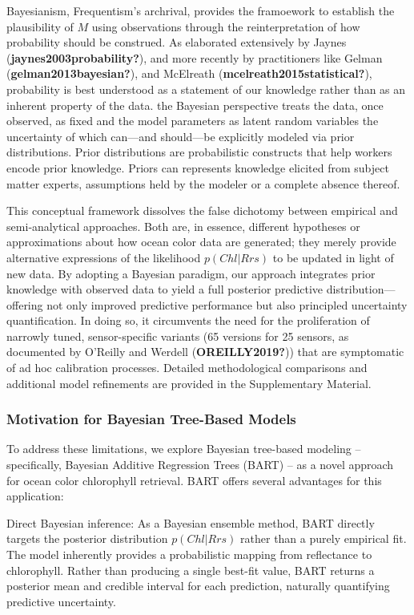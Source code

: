 \documentclass[
]{agujournal2019}
\begin{document}
Bayesianism, Frequentism's archrival, provides the framoework to
establish the plausibility of \(M\) using observations through the
reinterpretation of how probability should be construed. As elaborated
extensively by Jaynes (\textbf{jaynes2003probability?}), and more
recently by practitioners like Gelman (\textbf{gelman2013bayesian?}),
and McElreath (\textbf{mcelreath2015statistical?}), probability is best
understood as a statement of our knowledge rather than as an inherent
property of the data. the Bayesian perspective treats the data, once
observed, as fixed and the model parameters as latent random variables
the uncertainty of which can---and should---be explicitly modeled via
prior distributions. Prior distributions are probabilistic constructs
that help workers encode prior knowledge. Priors can represents
knowledge elicited from subject matter experts, assumptions held by the
modeler or a complete absence thereof.

This conceptual framework dissolves the false dichotomy between
empirical and semi‑analytical approaches. Both are, in essence,
different hypotheses or approximations about how ocean color data are
generated; they merely provide alternative expressions of the likelihood
\(p(Chl | Rrs)\) to be updated in light of new data. By adopting a
Bayesian paradigm, our approach integrates prior knowledge with observed
data to yield a full posterior predictive distribution---offering not
only improved predictive performance but also principled uncertainty
quantification. In doing so, it circumvents the need for the
proliferation of narrowly tuned, sensor-specific variants (65 versions
for 25 sensors, as documented by O'Reilly and Werdell
(\textbf{OREILLY2019?})) that are symptomatic of ad hoc calibration
processes. Detailed methodological comparisons and additional model
refinements are provided in the Supplementary Material.

\subsubsection{Motivation for Bayesian Tree-Based
Models}\label{motivation-for-bayesian-tree-based-models}

To address these limitations, we explore Bayesian tree-based modeling --
specifically, Bayesian Additive Regression Trees (BART) -- as a novel
approach for ocean color chlorophyll retrieval. BART offers several
advantages for this application:

Direct Bayesian inference: As a Bayesian ensemble method, BART directly
targets the posterior distribution \(p(Chl | Rrs)\) rather than a purely
empirical fit. The model inherently provides a probabilistic mapping
from reflectance to chlorophyll. Rather than producing a single best-fit
value, BART returns a posterior mean and credible interval for each
prediction, naturally quantifying predictive uncertainty.
\end{document}
